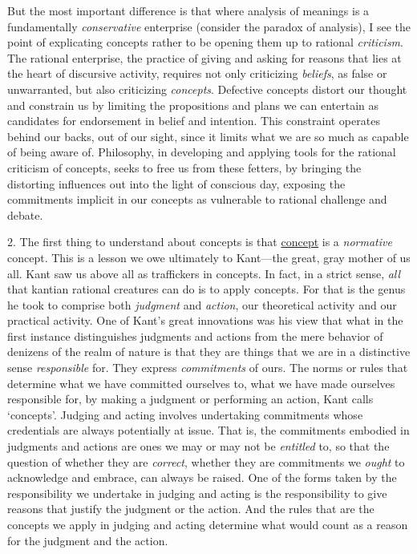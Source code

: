 But the most important difference is that where analysis of meanings is
a fundamentally \emph{conservative} enterprise (consider the paradox of
analysis), I see the point of explicating concepts rather to be opening
them up to rational \emph{criticism}. The rational enterprise, the
practice of giving and asking for reasons that lies at the heart of
discursive activity, requires not only criticizing \emph{beliefs}, as
false or unwarranted, but also criticizing \emph{concepts}. Defective
concepts distort our thought and constrain us by limiting the
propositions and plans we can entertain as candidates for endorsement in
belief and intention. This constraint operates behind our backs, out of
our sight, since it limits what we are so much as capable of being aware
of. Philosophy, in developing and applying tools for the rational
criticism of concepts, seeks to free us from these fetters, by bringing
the distorting influences out into the light of conscious day, exposing
the commitments implicit in our concepts as vulnerable to rational
challenge and debate.

2. The first thing to understand about concepts is that
\underline{concept} is a \emph{normative} concept. This is a lesson we
owe ultimately to Kant---the great, gray mother of us all. Kant saw us
above all as traffickers in concepts. In fact, in a strict sense,
\emph{all} that kantian rational creatures can do is to apply concepts.
For that is the genus he took to comprise both \emph{judgment} and
\emph{action}, our theoretical activity and our practical activity. One
of Kant's great innovations was his view that what in the first instance
distinguishes judgments and actions from the mere behavior of denizens
of the realm of nature is that they are things that we are in a
distinctive sense \emph{responsible} for. They express
\emph{commitments} of ours. The norms or rules that determine what we
have committed ourselves to, what we have made ourselves responsible
for, by making a judgment or performing an action, Kant calls
`concepts'. Judging and acting involves undertaking commitments whose
credentials are always potentially at issue. That is, the commitments
embodied in judgments and actions are ones we may or may not be
\emph{entitled} to, so that the question of whether they are
\emph{correct}, whether they are commitments we \emph{ought} to
acknowledge and embrace, can always be raised. One of the forms taken by
the responsibility we undertake in judging and acting is the
responsibility to give reasons that justify the judgment or the action.
And the rules that are the concepts we apply in judging and acting
determine what would count as a reason for the judgment and the action.

